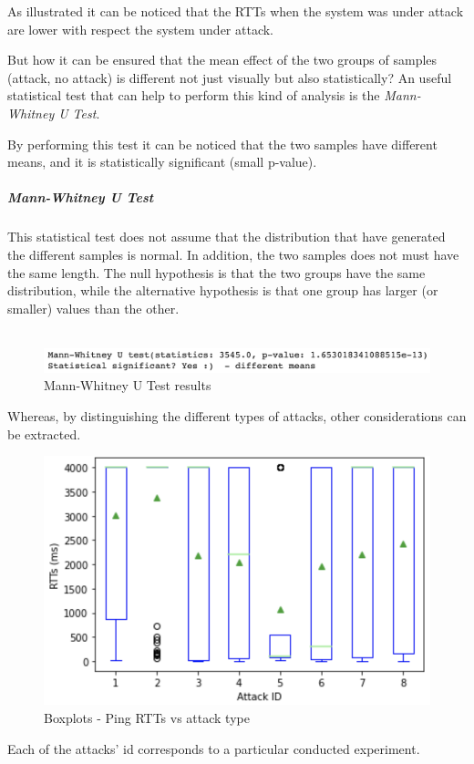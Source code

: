 \documentclass[fleqn, 11pt]{SelfArx} %
\begin{document}
As illustrated it can be noticed that the RTTs when the system was under attack are lower with respect the system under attack.

But how it can be ensured that the mean effect of the two groups of samples (attack, no attack) is different not just visually but also statistically?
An useful statistical test that can help to perform this kind of analysis is the {\it{Mann-Whitney U Test}}.

By performing this test it can be noticed that the two samples have different means, and it is statistically significant (small p-value).

\subparagraph{Mann-Whitney U Test \cite{MannWhitneyU}}
This statistical test does not assume that the distribution that have generated the different samples is normal.
In addition, the two samples does not must have the same length.
The null hypothesis is that the two groups have the same distribution, while the alternative hypothesis is that one group has larger (or smaller) values than the other.\\\\

\begin{figure}[H]\centering
    \includegraphics[width=\linewidth]{./ping/mannwhitneyu1.png}
    \caption{Mann-Whitney U Test results}
\end{figure}

Whereas, by distinguishing the different types of attacks, other considerations can be extracted.

\begin{figure}[H]\centering
    \includegraphics[width=\linewidth]{./ping/ping-boxplot2.png}
    \caption{Boxplots - Ping RTTs vs attack type}
	\label{Figure-pingbp2}
\end{figure}
Each of the attacks' id corresponds to a particular conducted experiment.
\end{document}
